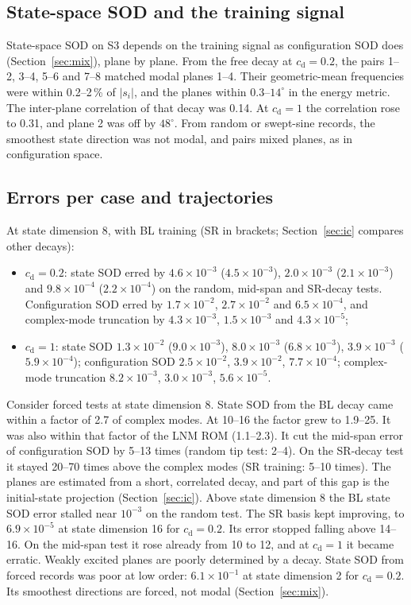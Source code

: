 \documentclass[11pt]{article}
\begin{document}
\subsection{State-space SOD and the training signal}\label{sec:s-smix}
State-space SOD on S3 depends on the training signal as configuration SOD does (Section~\ref{sec:mix}), plane by plane. From the free decay at $c_{\mathrm d}=0.2$, the pairs 1--2, 3--4, 5--6 and 7--8 matched modal planes 1--4. Their geometric-mean frequencies were within 0.2--2\,\% of $|s_i|$, and the planes within $0.3$--$14^\circ$ in the energy metric. The inter-plane correlation of that decay was 0.14.
At $c_{\mathrm d}=1$ the correlation rose to 0.31, and plane 2 was off by $48^\circ$.
From random or swept-sine records, the smoothest state direction was not modal, and pairs mixed planes, as in configuration space.

\subsection{Errors per case and trajectories}\label{sec:s-complex}
At state dimension 8, with BL training (SR in brackets; Section~\ref{sec:ic} compares other decays):
\begin{itemize}
\item $c_{\mathrm d}=0.2$: state SOD erred by $4.6\times10^{-3}$ ($4.5\times10^{-3}$), $2.0\times10^{-3}$ ($2.1\times10^{-3}$) and $9.8\times10^{-4}$ ($2.2\times10^{-4}$) on the random, mid-span and SR-decay tests. Configuration SOD erred by $1.7\times10^{-2}$, $2.7\times10^{-2}$ and $6.5\times10^{-4}$, and complex-mode truncation by $4.3\times10^{-3}$, $1.5\times10^{-3}$ and $4.3\times10^{-5}$;
\item $c_{\mathrm d}=1$: state SOD $1.3\times10^{-2}$ ($9.0\times10^{-3}$), $8.0\times10^{-3}$ ($6.8\times10^{-3}$), $3.9\times10^{-3}$ ($5.9\times10^{-4}$); configuration SOD $2.5\times10^{-2}$, $3.9\times10^{-2}$, $7.7\times10^{-4}$; complex-mode truncation $8.2\times10^{-3}$, $3.0\times10^{-3}$, $5.6\times10^{-5}$.
\end{itemize}
Consider forced tests at state dimension 8. State SOD from the BL decay came within a factor of 2.7 of complex modes. At 10--16 the factor grew to 1.9--25. It was also within that factor of the LNM ROM (1.1--2.3). It cut the mid-span error of configuration SOD by 5--13 times (random tip test: 2--4). On the SR-decay test it stayed 20--70 times above the complex modes (SR training: 5--10 times). The planes are estimated from a short, correlated decay, and part of this gap is the initial-state projection (Section~\ref{sec:ic}).
Above state dimension 8 the BL state SOD error stalled near $10^{-3}$ on the random test. The SR basis kept improving, to $6.9\times10^{-5}$ at state dimension 16 for $c_{\mathrm d}=0.2$. Its error stopped falling above 14--16. On the mid-span test it rose already from 10 to 12, and at $c_{\mathrm d}=1$ it became erratic. Weakly excited planes are poorly determined by a decay.
State SOD from forced records was poor at low order: $6.1\times10^{-1}$ at state dimension 2 for $c_{\mathrm d}=0.2$. Its smoothest directions are forced, not modal (Section~\ref{sec:mix}).
\end{document}
